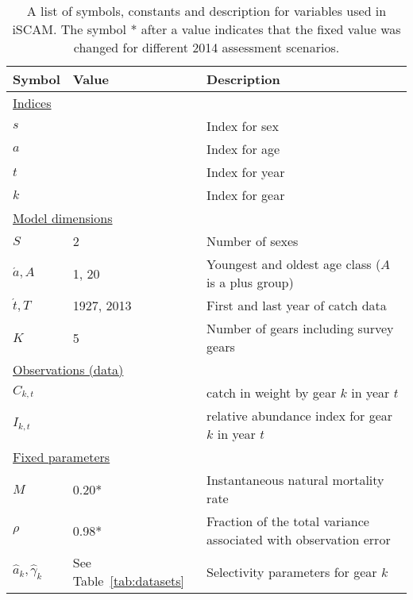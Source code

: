 \clearpage

\begin{table}[b]
\centering
\caption{\label{tab:variables} A list of symbols, constants and description for variables used in iSCAM.  The symbol * after a value indicates that the fixed value was changed for different 2014 assessment scenarios.}
\begin{tabular}{lll}
\hline
\bf{Symbol} & \bf{Value} & \bf{Description} \\
\hline
%
\multicolumn{3}{l}{\underline{Indices}}\\
$s$ & & Index for sex\\
$a$ & & Index for age\\
$t$ & & Index for year\\
$k$ & & Index for gear\\
\multicolumn{3}{l}{\underline{Model dimensions}}\\
$S$             & 2             & Number of sexes\\
$\acute{a}, A$  & 1, 20         & Youngest and oldest age class ($A$ is a plus group)\\
$\acute{t}, T$  & 1927, 2013    & First and last year of catch data\\
$K$             & 5             & Number of gears including survey gears\\
\multicolumn{3}{l}{\underline{Observations (data)}}\\
$C_{k,t}$       & & catch in weight by gear $k$ in year $t$\\
$I_{k,t}$       & & relative abundance index for gear $k$ in year $t$\\
\multicolumn{3}{l}{\underline{Fixed parameters}}\\
$M$                 &0.20* & Instantaneous natural mortality rate \\
$\rho$              &0.98* & Fraction of the total variance associated with observation error\\
$\hat{a}_k, \hat{\gamma}_k$    &See Table~\ref{tab:datasets} & Selectivity parameters for gear $k$ \\

\end{tabular}
\end{table}
